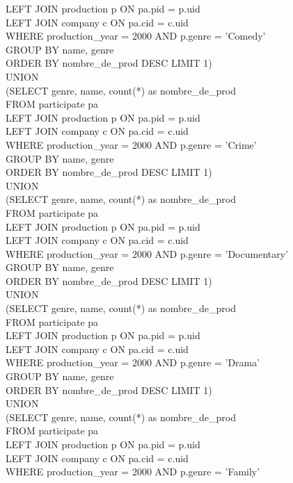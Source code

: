 \documentclass{article}
\begin{document}
LEFT JOIN production p ON pa.pid = p.uid\\
LEFT JOIN company c ON pa.cid = c.uid\\
WHERE production_year = 2000 AND p.genre = 'Comedy'\\  
GROUP BY name, genre\\
ORDER BY nombre_de_prod DESC LIMIT 1)\\
UNION\\
(SELECT genre, name, count(*) as nombre_de_prod\\
FROM participate pa\\
LEFT JOIN production p ON pa.pid = p.uid\\
LEFT JOIN company c ON pa.cid = c.uid\\
WHERE production_year = 2000 AND p.genre = 'Crime'  \\
GROUP BY name, genre\\
ORDER BY nombre_de_prod DESC LIMIT 1)\\
UNION\\
(SELECT genre, name, count(*) as nombre_de_prod\\
FROM participate pa\\
LEFT JOIN production p ON pa.pid = p.uid\\
LEFT JOIN company c ON pa.cid = c.uid\\
WHERE production_year = 2000 AND p.genre = 'Documentary'\\  
GROUP BY name, genre\\
ORDER BY nombre_de_prod DESC LIMIT 1)\\
UNION \\
(SELECT genre, name, count(*) as nombre_de_prod\\
FROM participate pa\\
LEFT JOIN production p ON pa.pid = p.uid\\
LEFT JOIN company c ON pa.cid = c.uid\\
WHERE production_year = 2000 AND p.genre = 'Drama'  \\
GROUP BY name, genre\\
ORDER BY nombre_de_prod DESC LIMIT 1)\\
UNION\\
(SELECT genre, name, count(*) as nombre_de_prod\\
FROM participate pa\\
LEFT JOIN production p ON pa.pid = p.uid\\
LEFT JOIN company c ON pa.cid = c.uid\\
WHERE production_year = 2000 AND p.genre = 'Family'  \\
\end{document}
